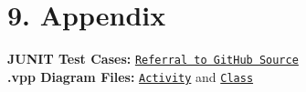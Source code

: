 \documentclass{article}
\begin{document}
\section*{9. Appendix}

\textbf{JUNIT Test Cases:}
\href{https://github.com/rarbin/SWENGCA26/blob/main/resources/JUNITTESTS.txt}{\texttt{Referral to GitHub Source}}\\
\textbf{.vpp Diagram Files:}
\href{https://github.com/rarbin/SWENGCA26/blob/main/resources/SETUP_APP_ACTIVITYD.vpp}{\texttt{Activity}} and
\href{https://github.com/rarbin/SWENGCA26/blob/main/resources/SETUP_App_ClassD.vpp}{\texttt{Class}}\\
\appendix
\end{document}
